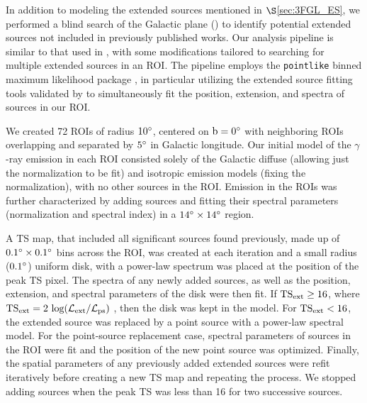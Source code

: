 In addition to modeling the extended sources mentioned in $\S$\ref{sec:3FGL_ES}, we performed a blind search of the Galactic plane  (\blat) to identify potential extended sources not included in previously published works. Our analysis pipeline is similar to that used in \cite{hewittSNRcat13}, with some modifications tailored to searching for multiple extended sources in an ROI. The pipeline employs the {\tt pointlike} binned maximum likelihood package \citep{Kerr10}, in particular utilizing the extended source fitting tools validated by \cite{Lande12} to simultaneously fit the position, extension, and spectra of sources in our ROI. 

We created 72 ROIs of radius ${\rm 10^{\circ}}$, centered on ${\rm b = 0^{\circ}}$ with neighboring ROIs overlapping and separated by ${\rm 5^{\circ}}$ in Galactic longitude.  Our initial model of the $\gamma$-ray emission in each ROI consisted solely of the Galactic diffuse (allowing just the normalization to be fit) and isotropic emission models (fixing the normalization), with no other sources in the ROI. Emission in the ROIs was further characterized by adding sources and fitting their spectral parameters (normalization and spectral index) in a ${\rm 14^{\circ}}\times{\rm 14^{\circ}}$ region. %

A TS map, that included all significant sources found previously, made up of ${\rm 0.1^{\circ}}\times{\rm 0.1^{\circ}}$ bins across the ROI, was created at each iteration and a small radius (${\rm 0.1^{\circ}}$) uniform disk, with a power-law spectrum was placed at the position of the peak TS pixel. The spectra of any newly added sources, as well as the position, extension, and spectral parameters of the disk were then fit. If $\rm TS_{ext} \geq 16$, where  ${\rm TS_{ext} = 2~log(\mathcal{L}_{ext} / \mathcal{L}_{ps})}$ \citep[\ie twice the logarithm likelihood ratio of an extended to a point source,][]{Lande12}, then the disk was kept in the model. For $\rm TS_{ext} < 16$, the extended source was replaced by a point source with a power-law spectral model. For the point-source replacement case, spectral parameters of sources in the ROI were fit and the position of the new point source was optimized. Finally, the spatial parameters of any previously added extended sources were refit iteratively before creating a new TS map and repeating the process. We stopped adding sources when the peak TS was less than 16 for two successive sources. 

